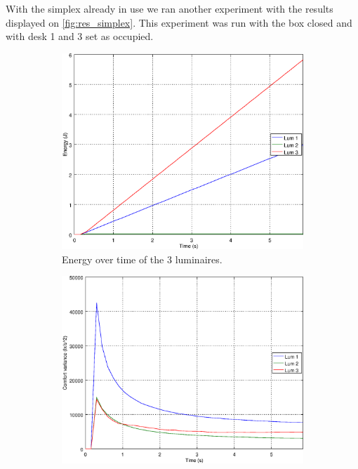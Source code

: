 With the simplex already in use we ran another experiment with the results displayed on \autoref{fig:res_simplex}. This experiment was run with the box closed and with desk 1 and 3 set as occupied.

\begin{figure}[ht]
    \centering
    \begin{subfigure}[t]{0.32\textwidth}
    \centering
    \includegraphics[width=.95\textwidth]{img/e_}
    \caption{Energy over time of the 3 luminaires.}
    \label{fig:e_}
    \end{subfigure}
    \begin{subfigure}[t]{0.32\textwidth}
    \centering
    \includegraphics[width=.95\textwidth]{img/f_}

\end{subfigure}
\end{figure}
